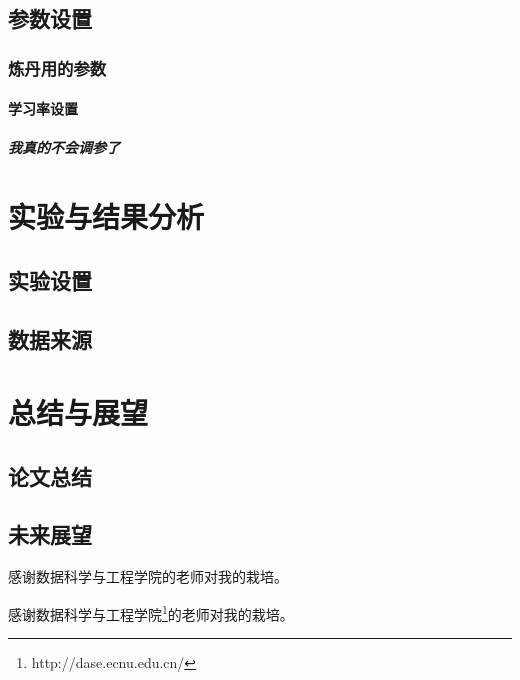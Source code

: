 \documentclass{ecnuthesis}
\begin{document}
\section{参数设置}

\subsection{炼丹用的参数}

\subsubsection{学习率设置}

\paragraph{我真的不会调参了}

\chapter{实验与结果分析}

\section{实验设置}

\section{数据来源}


\chapter{总结与展望}
\section{论文总结}

\section{未来展望}

\backmatter
\printbibliography





\begin{appendix}
 感谢数据科学与工程学院的老师对我的栽培。
\end{appendix}

\begin{acknowledgement}

感谢数据科学与工程学院\footnote{http://dase.ecnu.edu.cn/}的老师对我的栽培。
\end{acknowledgement}
\end{document}
